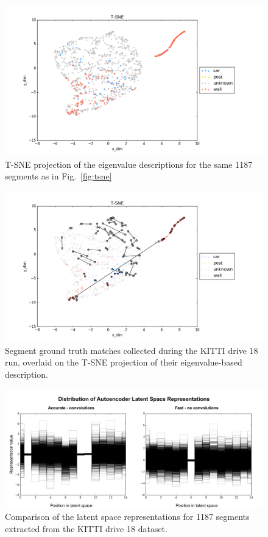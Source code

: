 \begin{figure}
  \centering
  \includegraphics[width=5.2in]{images/t-sne_eig.png}
\caption{T-SNE projection of the eigenvalue descriptions for the same 1187 segments as in Fig.~\ref{fig:tsne}}
  \label{fig:tsne_eig}
\end{figure}

\begin{figure}
  \centering
  \includegraphics[width=5.2in]{images/t-sne_matches_eig.png}
\caption{Segment ground truth matches collected during the KITTI drive 18 run, overlaid on the T-SNE projection of their eigenvalue-based description.}
  \label{fig:tsne_matches_eig}
\end{figure}

\begin{figure}
  \centering
  \includegraphics[width=5.2in]{images/fastvaccuratefeatures.pdf}
  \caption{Comparison of the latent space representations for 1187 segments extracted from the KITTI drive 18 dataset.}
  \label{fig:fastvaccurate_features}
\end{figure}

